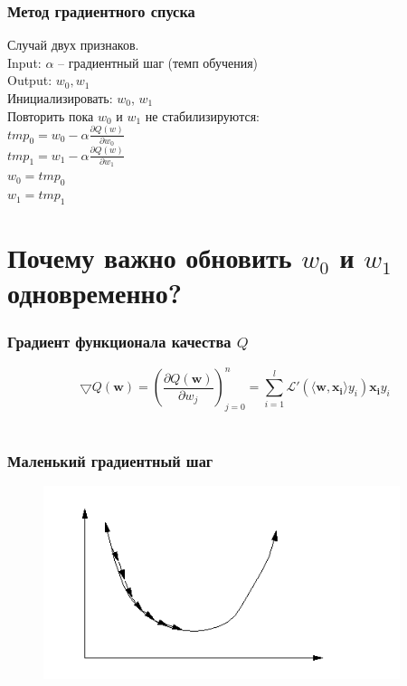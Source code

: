 \documentclass[10pt]{beamer}
\begin{document}
\begin{frame}\frametitle{Метод градиентного спуска}
	Случай двух признаков.\\
	Input: $\alpha$ -- градиентный шаг (темп обучения)\\
	Output: $w_0, w_1$\\
	\vspace{3mm}
	Инициализировать: $w_0$, $w_1$\\
	Повторить пока $w_0$ и $w_1$ не стабилизируются:\\
	\hspace{10mm} $tmp_0 =  w_0 - \alpha \frac{\partial Q(w)}{\partial w_0}$\\
	\hspace{10mm} $tmp_1 =  w_1 - \alpha \frac{\partial Q(w)}{\partial w_1}$\\
	\hspace{10mm} $w_0 = tmp_0$\\
	\hspace{10mm} $w_1 = tmp_1$
\end{frame}

\section{Почему важно обновить $w_0$ и $w_1$ одновременно?}

\begin{frame}\frametitle{Градиент функционала качества $Q$}
	$$\bigtriangledown Q(\mathbf{w}) = (\frac{\partial Q(\mathbf{w})}{\partial w_j})_{j=0}^n = \sum\limits_{i=1}^l \mathcal{L}'(\langle \mathbf{w}, \mathbf{x_i} \rangle y_i) \mathbf{x_i} y_i$$\\
\end{frame}

\begin{frame}\frametitle{Маленький градиентный шаг}
	\begin{figure}[htbp]
	  \includegraphics[height=160pt, keepaspectratio = true]{images/learning_rate_small}
	\end{figure}
\end{frame}
\end{document}
